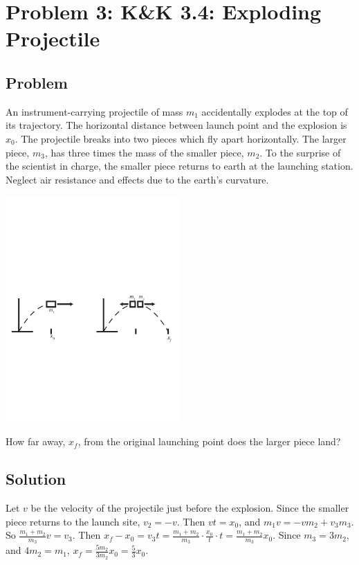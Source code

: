 \documentclass[solutions]{esg8012pset}
\begin{document}
\section*{Problem 3: K\&K 3.4: Exploding Projectile}
\subsection*{Problem}
  An instrument-carrying projectile of mass $m_1$ accidentally explodes at the top of its trajectory. The horizontal distance between launch point and the explosion is $x_0$.  The projectile breaks into two pieces which fly apart horizontally. The larger piece, $m_3$, has three times the mass of the smaller piece, $m_2$. To the surprise of the scientist in charge, the smaller piece returns to earth at the launching station. Neglect air resistance and effects due to the earth's curvature.
  \begin{center}\includegraphics[width=0.5\textwidth]{ps_04_1}\end{center}
  How far away, $x_f$, from the original launching point does the larger piece land?
\subsection*{Solution}
  Let $v$ be the velocity of the projectile just before the explosion.  Since the smaller piece returns to the launch site, $v_2 = -v$.  Then $v t = x_0$, and $m_1 v = -v m_2 + v_3 m_3$.  So $\frac{m_1+m_2}{m_3} v = v_3$.  Then $x_f - x_0 = v_3 t = \frac{m_1+m_2}{m_3}\cdot \frac{x_0}{t} \cdot t = \frac{m_1+m_2}{m_3}x_0$.  Since $m_3 = 3m_2$, and $4m_2 = m_1$, $x_f = \frac{5m_2}{3m_2}x_0 = \frac{5}{3}x_0$.
\end{document}
